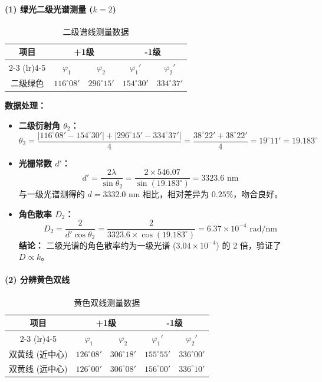 \documentclass[]{../template/Report}%
\begin{document}
\begin{fullreportonly}
\paragraph{(1) 绿光二级光谱测量 ($k=2$)} \mbox{}
\begin{table}[H]
    \centering
    \caption{二级谱线测量数据}
    \begin{tabular}{ccccc}
        \toprule
        \multirow{2}{*}{项目} & \multicolumn{2}{c}{+1级} & \multicolumn{2}{c}{-1级} \\
        \cmidrule(lr){2-3} \cmidrule(lr){4-5}
         & $\varphi_1$ & $\varphi_2$ & $\varphi_1'$ & $\varphi_2'$ \\
        \midrule
        二级绿色 & $116^\circ 08'$ & $296^\circ 15'$ & $154^\circ 30'$ & $334^\circ 37'$ \\
        \bottomrule
    \end{tabular}
\end{table}

\textbf{数据处理：}
\begin{itemize}
    \item \textbf{二级衍射角 $\theta_2$：}
    \[
    \theta_2 = \frac{|116^\circ 08' - 154^\circ 30'| + |296^\circ 15' - 334^\circ 37'|}{4} = \frac{38^\circ 22' + 38^\circ 22'}{4} = 19^\circ 11' = 19.183^\circ
    \]
    \item \textbf{光栅常数 $d'$：}
    \[
    d' = \frac{2\lambda}{\sin \theta_2} = \frac{2 \times 546.07}{\sin(19.183^\circ)} = 3323.6 \text{ nm}
    \]
    与一级光谱测得的 $d=3332.0 \text{ nm}$ 相比，相对差异为 $0.25\%$，吻合良好。
    \item \textbf{角色散率 $D_2$：}
    \[
    D_2 = \frac{2}{d' \cos \theta_2} = \frac{2}{3323.6 \times \cos(19.183^\circ)} = 6.37 \times 10^{-4} \text{ rad/nm}
    \]
    \textbf{结论：} 二级光谱的角色散率约为一级光谱 ($3.04 \times 10^{-4}$) 的 2 倍，验证了 $D \propto k$。
\end{itemize}

\paragraph{(2) 分辨黄色双线} \mbox{}
\begin{table}[H]
    \centering
    \caption{黄色双线测量数据}
    \begin{tabular}{ccccc}
        \toprule
        \multirow{2}{*}{项目} & \multicolumn{2}{c}{+1级} & \multicolumn{2}{c}{-1级} \\
        \cmidrule(lr){2-3} \cmidrule(lr){4-5}
         & $\varphi_1$ & $\varphi_2$ & $\varphi_1'$ & $\varphi_2'$ \\
        \midrule
        双黄线 (近中心) & $126^\circ 08'$ & $306^\circ 18'$ & $155^\circ 55'$ & $336^\circ 00'$ \\
        双黄线 (远中心) & $126^\circ 00'$ & $306^\circ 08'$ & $156^\circ 00'$ & $336^\circ 10'$ \\
        \bottomrule
    \end{tabular}
\end{table}


\end{fullreportonly}
\end{document}
